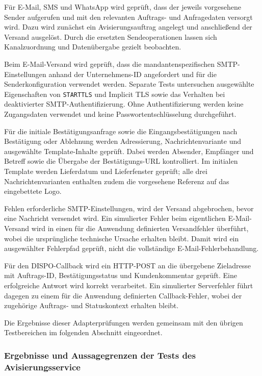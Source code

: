 \documentclass[
  12pt,
  a4paper,
  oneside
]{article}
\begin{document}
Für E-Mail, SMS und WhatsApp wird geprüft, dass der jeweils vorgesehene Sender
aufgerufen und mit den relevanten Auftrags- und Anfragedaten versorgt wird. Dazu
wird zunächst ein Avisierungsauftrag angelegt und anschließend der Versand
ausgelöst. Durch die ersetzten Sendeoperationen lassen sich Kanalzuordnung und
Datenübergabe gezielt beobachten.

Beim E-Mail-Versand wird geprüft, dass die mandantenspezifischen
SMTP-Einstellungen anhand der Unternehmens-ID angefordert und für die
Senderkonfiguration verwendet werden. Separate Tests untersuchen ausgewählte
Eigenschaften von \texttt{STARTTLS} und Implicit TLS sowie das Verhalten bei
deaktivierter SMTP-Authentifizierung. Ohne Authentifizierung werden keine
Zugangsdaten verwendet und keine Passwortentschlüsselung durchgeführt.

Für die initiale Bestätigungsanfrage sowie die Eingangsbestätigungen nach
Bestätigung oder Ablehnung werden Adressierung, Nachrichtenvariante und
ausgewählte Template-Inhalte geprüft. Dabei werden Absender, Empfänger und
Betreff sowie die Übergabe der Bestätigungs-URL kontrolliert. Im initialen
Template werden Lieferdatum und Lieferfenster geprüft; alle drei
Nachrichtenvarianten enthalten zudem die vorgesehene Referenz auf das
eingebettete Logo.

Fehlen erforderliche SMTP-Einstellungen, wird der Versand abgebrochen, bevor
eine Nachricht versendet wird. Ein simulierter Fehler beim eigentlichen
E-Mail-Versand wird in einen für die Anwendung definierten Versandfehler
überführt, wobei die ursprüngliche technische Ursache erhalten bleibt. Damit
wird ein ausgewählter Fehlerpfad geprüft, nicht die vollständige
E-Mail-Fehlerbehandlung.

Für den DISPO-Callback wird ein HTTP-POST an die übergebene Zieladresse mit
Auftrags-ID, Bestätigungsstatus und Kundenkommentar geprüft. Eine erfolgreiche
Antwort wird korrekt verarbeitet. Ein simulierter Serverfehler führt dagegen
zu einem für die Anwendung definierten Callback-Fehler, wobei der zugehörige
Auftrags- und Statuskontext erhalten bleibt.

Die Ergebnisse dieser Adapterprüfungen werden gemeinsam mit den übrigen
Testbereichen im folgenden Abschnitt eingeordnet.

\subsubsection{Ergebnisse und Aussagegrenzen der Tests des Avisierungsservice}
\label{sec:test-ergebnisse-aussagegrenzen}
\end{document}
